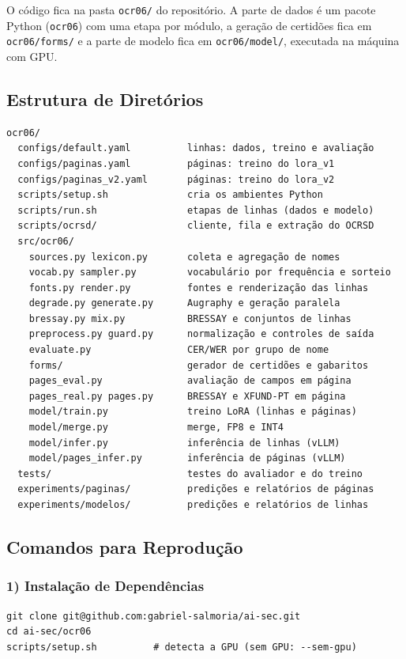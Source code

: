 O código fica na pasta \texttt{ocr06/} do repositório. A parte de dados é um pacote Python (\texttt{ocr06}) com uma etapa por módulo, a geração de certidões fica em \texttt{ocr06/forms/} e a parte de modelo fica em \texttt{ocr06/model/}, executada na máquina com GPU.

\subsection{Estrutura de Diretórios}

{\small
\begin{verbatim}
ocr06/
  configs/default.yaml          linhas: dados, treino e avaliação
  configs/paginas.yaml          páginas: treino do lora_v1
  configs/paginas_v2.yaml       páginas: treino do lora_v2
  scripts/setup.sh              cria os ambientes Python
  scripts/run.sh                etapas de linhas (dados e modelo)
  scripts/ocrsd/                cliente, fila e extração do OCRSD
  src/ocr06/
    sources.py lexicon.py       coleta e agregação de nomes
    vocab.py sampler.py         vocabulário por frequência e sorteio
    fonts.py render.py          fontes e renderização das linhas
    degrade.py generate.py      Augraphy e geração paralela
    bressay.py mix.py           BRESSAY e conjuntos de linhas
    preprocess.py guard.py      normalização e controles de saída
    evaluate.py                 CER/WER por grupo de nome
    forms/                      gerador de certidões e gabaritos
    pages_eval.py               avaliação de campos em página
    pages_real.py pages.py      BRESSAY e XFUND-PT em página
    model/train.py              treino LoRA (linhas e páginas)
    model/merge.py              merge, FP8 e INT4
    model/infer.py              inferência de linhas (vLLM)
    model/pages_infer.py        inferência de páginas (vLLM)
  tests/                        testes do avaliador e do treino
  experiments/paginas/          predições e relatórios de páginas
  experiments/modelos/          predições e relatórios de linhas
\end{verbatim}
}

\subsection{Comandos para Reprodução}

\subsubsection*{1) Instalação de Dependências}
{\footnotesize
\begin{verbatim}
git clone git@github.com:gabriel-salmoria/ai-sec.git
cd ai-sec/ocr06
scripts/setup.sh          # detecta a GPU (sem GPU: --sem-gpu)
\end{verbatim}
}


